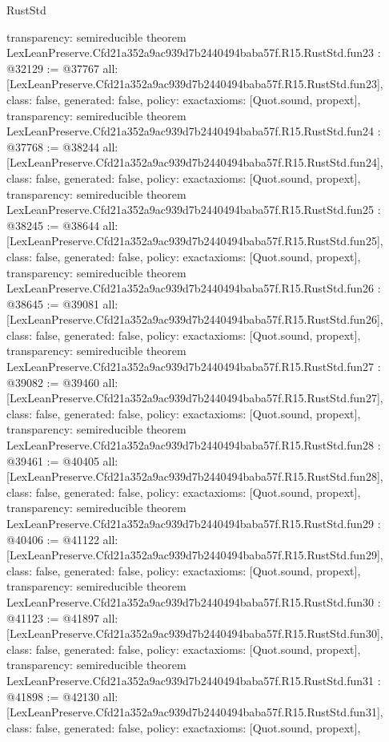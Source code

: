 \begin{lexlean}{RustStd}
\begin{coremodule}
{  transparency: semireducible
}
theorem LexLeanPreserve.Cfd21a352a9ac939d7b2440494baba57f.R15.RustStd.fun23 : @32129 := @37767 {
  all: [LexLeanPreserve.Cfd21a352a9ac939d7b2440494baba57f.R15.RustStd.fun23],
  class: false,
  generated: false,
  policy: exact{axioms: [Quot.sound, propext]},
  transparency: semireducible
}
theorem LexLeanPreserve.Cfd21a352a9ac939d7b2440494baba57f.R15.RustStd.fun24 : @37768 := @38244 {
  all: [LexLeanPreserve.Cfd21a352a9ac939d7b2440494baba57f.R15.RustStd.fun24],
  class: false,
  generated: false,
  policy: exact{axioms: [Quot.sound, propext]},
  transparency: semireducible
}
theorem LexLeanPreserve.Cfd21a352a9ac939d7b2440494baba57f.R15.RustStd.fun25 : @38245 := @38644 {
  all: [LexLeanPreserve.Cfd21a352a9ac939d7b2440494baba57f.R15.RustStd.fun25],
  class: false,
  generated: false,
  policy: exact{axioms: [Quot.sound, propext]},
  transparency: semireducible
}
theorem LexLeanPreserve.Cfd21a352a9ac939d7b2440494baba57f.R15.RustStd.fun26 : @38645 := @39081 {
  all: [LexLeanPreserve.Cfd21a352a9ac939d7b2440494baba57f.R15.RustStd.fun26],
  class: false,
  generated: false,
  policy: exact{axioms: [Quot.sound, propext]},
  transparency: semireducible
}
theorem LexLeanPreserve.Cfd21a352a9ac939d7b2440494baba57f.R15.RustStd.fun27 : @39082 := @39460 {
  all: [LexLeanPreserve.Cfd21a352a9ac939d7b2440494baba57f.R15.RustStd.fun27],
  class: false,
  generated: false,
  policy: exact{axioms: [Quot.sound, propext]},
  transparency: semireducible
}
theorem LexLeanPreserve.Cfd21a352a9ac939d7b2440494baba57f.R15.RustStd.fun28 : @39461 := @40405 {
  all: [LexLeanPreserve.Cfd21a352a9ac939d7b2440494baba57f.R15.RustStd.fun28],
  class: false,
  generated: false,
  policy: exact{axioms: [Quot.sound, propext]},
  transparency: semireducible
}
theorem LexLeanPreserve.Cfd21a352a9ac939d7b2440494baba57f.R15.RustStd.fun29 : @40406 := @41122 {
  all: [LexLeanPreserve.Cfd21a352a9ac939d7b2440494baba57f.R15.RustStd.fun29],
  class: false,
  generated: false,
  policy: exact{axioms: [Quot.sound, propext]},
  transparency: semireducible
}
theorem LexLeanPreserve.Cfd21a352a9ac939d7b2440494baba57f.R15.RustStd.fun30 : @41123 := @41897 {
  all: [LexLeanPreserve.Cfd21a352a9ac939d7b2440494baba57f.R15.RustStd.fun30],
  class: false,
  generated: false,
  policy: exact{axioms: [Quot.sound, propext]},
  transparency: semireducible
}
theorem LexLeanPreserve.Cfd21a352a9ac939d7b2440494baba57f.R15.RustStd.fun31 : @41898 := @42130 {
  all: [LexLeanPreserve.Cfd21a352a9ac939d7b2440494baba57f.R15.RustStd.fun31],
  class: false,
  generated: false,
  policy: exact{axioms: [Quot.sound, propext]},
}
\end{coremodule}
\end{lexlean}
